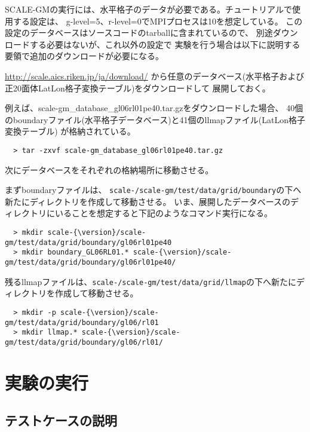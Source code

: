 SCALE-GMの実行には、水平格子のデータが必要である。チュートリアルで使用する設定は、
g-level=5、r-level=0でMPIプロセスは10を想定している。
この設定のデータベースはソースコードのtarballに含まれているので、
別途ダウンロードする必要はないが、これ以外の設定で
実験を行う場合は以下に説明する要領で追加のダウンロードが必要になる。

\noindent \url{http://scale.aics.riken.jp/ja/download/}
から任意のデータベース(水平格子および正20面体LatLon格子変換テーブル)をダウンロードして
展開しておく。

\noindent 例えば、scale-gm\_database\_gl06rl01pe40.tar.gzをダウンロードした場合、
40個のboundaryファイル(水平格子データベース)と41個のllmapファイル(LatLon格子変換テーブル)
が格納されている。
\begin{verbatim}
  > tar -zxvf scale-gm_database_gl06rl01pe40.tar.gz
\end{verbatim}


\noindent 次にデータベースをそれぞれの格納場所に移動させる。

\noindent まずboundaryファイルは、
\texttt{scale-{\version}/scale-gm/test/data/grid/boundary}の下へ新たにディレクトリを作成して移動させる。
いま、展開したデータベースのディレクトリにいることを想定すると下記のようなコマンド実行になる。

\begin{verbatim}
  > mkdir scale-{\version}/scale-gm/test/data/grid/boundary/gl06rl01pe40
  > mkdir boundary_GL06RL01.* scale-{\version}/scale-gm/test/data/grid/boundary/gl06rl01pe40/
\end{verbatim}

\noindent 残るllmapファイルは、\texttt{scale-{\version}/scale-gm/test/data/grid/llmap}の下へ新たにディレクトリを作成して移動させる。

\begin{verbatim}
  > mkdir -p scale-{\version}/scale-gm/test/data/grid/boundary/gl06/rl01
  > mkdir llmap.* scale-{\version}/scale-gm/test/data/grid/boundary/gl06/rl01/
\end{verbatim}


\section{実験の実行}
\subsection{テストケースの説明}

